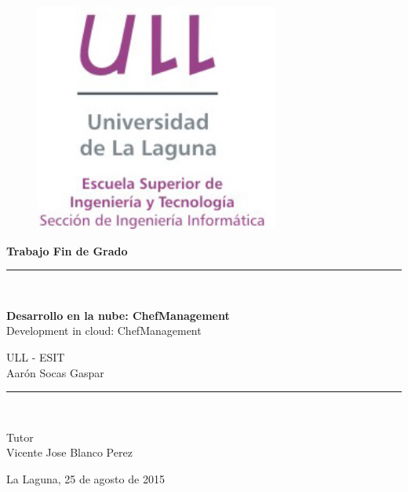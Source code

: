 \documentclass[a4paper,14pt]{report}
\begin{document}
\begin{titlepage}

	\begin{center}
		\vspace*{-1in}
		\begin{figure}[htb]
			\begin{center}
				\includegraphics[width=8cm]{./images/logotipo-secundario-ULL-ESIT.jpg}
			\end{center}
		\end{figure}

		\begin{Large}
			\textbf{{\huge Trabajo Fin de Grado}}
		\end{Large}
		\rule{80mm}{0.3mm}\\
	\end{center}

	\begin{center}
		\vspace*{0.2in}
		\begin{LARGE}
			\textbf{Desarrollo en la nube: ChefManagement} \\
			Development in cloud: ChefManagement \\
		\end{LARGE}

		\vspace*{0.2in}
		\begin{large}
			ULL - ESIT\\
			Aarón Socas Gaspar\\
		\end{large}
		\vspace*{0.3in}
		\rule{80mm}{0.1mm}\\
		
		\vspace*{0.1in}
		\begin{large}
			Tutor \\
			Vicente Jose Blanco Perez \\
		\end{large}
		\vspace*{0.3in}
		La Laguna, 25 de agosto de 2015\\
	\end{center}

\end{titlepage}

\newpage
$\ $
\thispagestyle{empty} %
\end{document}

